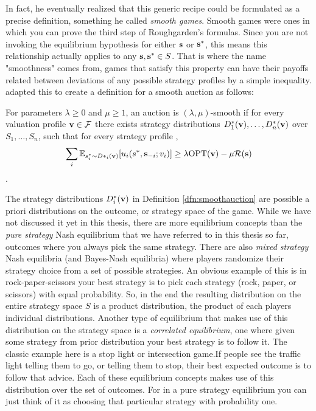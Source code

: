 \documentclass[12pt,twoside]{reedthesis}
\begin{document}
 In fact, he eventually realized that this generic recipe could be formulated as a precise definition, something he called {\em smooth games}. Smooth games were ones in which you can prove the third step of Roughgarden's formulas. Since you are not invoking the equilibrium hypothesis for either $\textbf{s}$ or $\textbf{s}^*$, this means this relationship actually applies to any $\textbf{s},\textbf{s}^* \in S$. That is where the name "smoothness" comes from, games that satisfy this property can have their payoffs related between deviations of any possible strategy profiles by a simple inequality. \cite{Syrgkanis2013} adapted this to create a definition for a smooth auction as follows:
\begin{dfn}
	For parameters $\lambda \geq 0$ and $\mu \geq 1$, an auction is $(\lambda, \mu)$-smooth if for every valuation profile $\textbf{v} \in \mathcal{F}$ there exists strategy distributions $D^*_1(\textbf{v}), \ldots, D^*_n(\textbf{v})$ over $S_1 , \ldots , S_n$, such that for every strategy profile \strategies,
	$$ \sum_i \mathbb{E}_{s^*_i \sim D*_i(\textbf{v})}[u_i(s^*, \textbf{s}_{-i};v_i)] \geq \lambda \text{OPT}(\textbf{v}) - \mu \mathcal{R}(\textbf{s})$$.
	\label{dfn:smoothauction}
\end{dfn}
The strategy distributions $D^*_i(\textbf{v})$ in Definition \ref{dfn:smoothauction} are possible a priori distributions on the outcome, or strategy space of the game. While we have not discussed it yet in this thesis, there are more equilibrium concepts than the {\em pure strategy} Nash equilibrium that we have referred to in this thesis so far, outcomes where you always pick the same strategy. There are also {\em mixed strategy} Nash equilibria (and Bayes-Nash equilibria) where players randomize their strategy choice from a set of possible strategies. An obvious example of this is in rock-paper-scissors your best strategy is to pick each strategy (rock, paper, or scissors) with equal probability. So, in the end the resulting distribution on the entire strategy space $S$ is a product distribution, the product of each players individual distributions. Another type of equilibrium that makes use of this distribution on the strategy space is a {\em correlated equilibrium}, one where given some strategy from prior distribution your best strategy is to follow it. The classic example here is a stop light or intersection game.If people see the traffic light telling them to go, or telling them to stop, their best expected outcome is to follow that advice. Each of these equilibrium concepts makes use of this distribution over the set of outcomes. For in a pure strategy equilibrium you can just think of it as choosing that particular strategy with probability one.
\end{document}
